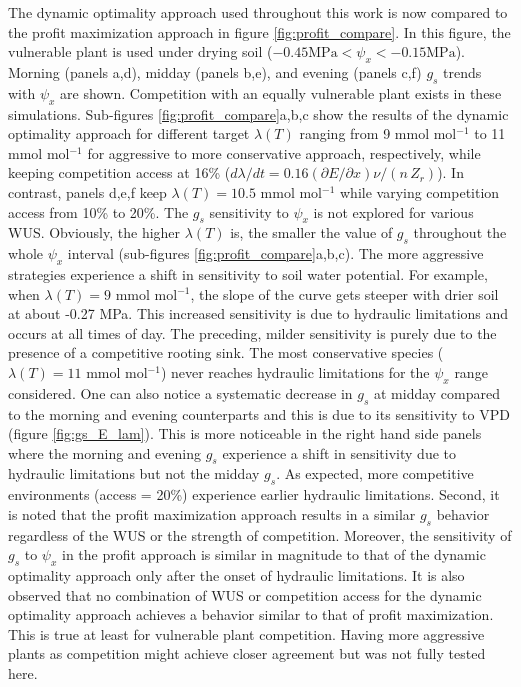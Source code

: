 \documentclass[utf8]{frontiersSCNS} %
\begin{document}
The dynamic optimality approach used throughout this work is now compared to the profit maximization approach in figure \ref{fig:profit_compare}. In this figure, the vulnerable plant is used under drying soil ($-0.45 \text{MPa} < \psi_x < -0.15 \text{MPa}$). Morning (panels a,d), midday (panels b,e), and evening (panels c,f) $g_s$ trends with $\psi_x$ are shown. Competition with an equally vulnerable plant exists in these simulations. Sub-figures \ref{fig:profit_compare}a,b,c show the results of the dynamic optimality approach for different target $\lambda(T)$ ranging from 9 mmol mol$^{-1}$ to 11 mmol mol$^{-1}$ for aggressive to more conservative approach, respectively, while keeping competition access at 16\% ($d\lambda/dt = 0.16 (\partial E / \partial x) \nu/(n\, Z_r) $). In contrast, panels d,e,f keep $\lambda(T)=10.5$ mmol mol$^{-1}$ while varying competition access from 10\% to 20\%.
The $g_s$ sensitivity to $\psi_x$ is not explored for various WUS. Obviously, the higher $\lambda(T)$ is, the smaller the value of $g_s$ throughout the whole $\psi_x$ interval (sub-figures \ref{fig:profit_compare}a,b,c). The more aggressive strategies experience a shift in sensitivity to soil water potential. For example, when $\lambda(T)=9$ mmol mol$^{-1}$, the slope of the curve gets steeper with drier soil at about -0.27 MPa. This increased sensitivity is due to hydraulic limitations and occurs at all times of day. The preceding, milder sensitivity is purely due to the presence of a competitive rooting sink. The most conservative species ($\lambda(T) = 11$ mmol mol$^{-1}$) never reaches hydraulic limitations for the $\psi_x$ range considered. One can also notice a systematic decrease in $g_s$ at midday compared to the morning and evening counterparts and this is due to its sensitivity to VPD (figure \ref{fig:gs_E_lam}). This is more noticeable in the right hand side panels where the morning and evening $g_s$ experience a shift in sensitivity due to hydraulic limitations but not the midday $g_s$. As expected, more competitive environments (access = 20\%) experience earlier hydraulic limitations.
Second, it is noted that the profit maximization approach results in a similar $g_s$ behavior regardless of the WUS or the strength of competition. Moreover, the sensitivity of $g_s$ to $\psi_x$ in the profit approach is similar in magnitude to that of the dynamic optimality approach only after the onset of hydraulic limitations. It is also observed that no combination of WUS or competition access for the dynamic optimality approach achieves a behavior similar to that of profit maximization. This is true at least for vulnerable plant competition. Having more aggressive plants as competition might achieve closer agreement but was not fully tested here. 
\end{document}
